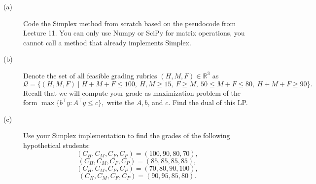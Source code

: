 \documentclass[11pt]{article}
\begin{document}
\begin{description}
    \item[(a)] Code the Simplex method from scratch based on the pseudocode from Lecture 11. You can only use Numpy or SciPy for matrix operations, you cannot call a method that already implements Simplex.
    \item[(b)] Denote the set of all feasible grading rubrics $(H,M,F)\in\mathbb{R}^3$ as
    $$ \mathcal{Q}=\{(H,M,F) \mid H+M+F\leq 100,\ H,M\geq 15,\ F\geq M,\ 50\leq M+F\leq 80,\ H+M+F\geq 90\}.$$
    Recall that we will compute your grade as maximization problem of the form $\max\{b^{\top} y : A^{\top}y \leq c\},$ write the $A, b$, and $c$. Find the dual of this LP.
    \item[(c)] Use your Simplex implementation to find the grades of the following hypothetical students:
    $$ (C_H,C_M,C_F,C_P) = (100,90,80,70),$$
    $$ (C_H,C_M,C_F,C_P) = (85,85,85,85),$$
    $$ (C_H,C_M,C_F,C_P) = (70,80,90,100),$$
$$(C_H, C_{M}, C_{F}, C_{P}) = (90, 95, 85, 80).$$
\end{description}
\end{document}
